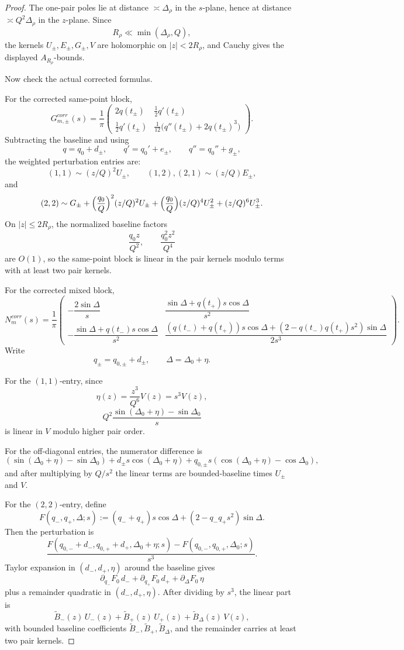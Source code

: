 \documentclass[11pt,a4paper]{amsart}
\def\corr{corr}%
\theoremstyle{plain}
\theoremstyle{definition}
\newcommand{\corr}{\mathrm{corr}}
\begin{document}
\begin{proof}
The one-pair poles lie at distance $\asymp \Delta_\rho$ in the $s$-plane,
hence at distance $\asymp Q^2\Delta_\rho$ in the $z$-plane. Since
\[
R_\rho\ll \min(\Delta_\rho,Q),
\]
the kernels $U_\pm,E_\pm,G_\pm,V$ are holomorphic on $|z|<2R_\rho$, and
Cauchy gives the displayed $A_{R_\rho}$-bounds.

Now check the actual corrected formulas.

For the corrected same-point block,
\[
G_{m,\pm}^{\corr}(s)=\frac1\pi
\begin{pmatrix}
2q(t_\pm) & \frac12 q'(t_\pm)\\[1ex]
\frac12 q'(t_\pm) & \frac1{12}\bigl(q''(t_\pm)+2q(t_\pm)^3\bigr)
\end{pmatrix}.
\]
Subtracting the baseline and using
\[
q=q_0+d_\pm,\qquad q'=q_0'+e_\pm,\qquad q''=q_0''+g_\pm,
\]
the weighted perturbation entries are:
\[
(1,1)\sim (z/Q)^2U_\pm,
\qquad
(1,2),(2,1)\sim (z/Q)E_\pm,
\]
and
\[
(2,2)\sim
G_\pm
+
\Bigl(\frac{q_0}{Q}\Bigr)^2 (z/Q)^2U_\pm
+
\Bigl(\frac{q_0}{Q}\Bigr)(z/Q)^4U_\pm^2
+
(z/Q)^6U_\pm^3.
\]
On $|z|\le 2R_\rho$, the normalized baseline factors
\[
\frac{q_0 z}{Q^2},\qquad \frac{q_0^2 z^2}{Q^4}
\]
are $O(1)$, so the same-point block is linear in the pair kernels modulo
terms with at least two pair kernels.

For the corrected mixed block,
\[
N_m^{\corr}(s)=\frac1\pi
\begin{pmatrix}
-\dfrac{2\sin\Delta}{s}
&
\dfrac{\sin\Delta+q(t_+)s\cos\Delta}{s^2}
\\[2ex]
-\dfrac{\sin\Delta+q(t_-)s\cos\Delta}{s^2}
&
\dfrac{(q(t_-)+q(t_+))s\cos\Delta+(2-q(t_-)q(t_+)s^2)\sin\Delta}{2s^3}
\end{pmatrix}.
\]
Write
\[
q_\pm=q_{0,\pm}+d_\pm,
\qquad
\Delta=\Delta_0+\eta.
\]

For the $(1,1)$-entry, since
\[
\eta(z)=\frac{z^3}{Q^6}V(z)=s^3V(z),
\]
\[
Q^2\frac{\sin(\Delta_0+\eta)-\sin\Delta_0}{s}
\]
is linear in $V$ modulo higher pair order.

For the off-diagonal entries, the numerator difference is
\[
(\sin(\Delta_0+\eta)-\sin\Delta_0)
+d_\pm s\cos(\Delta_0+\eta)
+q_{0,\pm}s(\cos(\Delta_0+\eta)-\cos\Delta_0),
\]
and after multiplying by $Q/s^2$ the linear terms are bounded-baseline times
$U_\pm$ and $V$.

For the $(2,2)$-entry, define
\[
F(q_-,q_+,\Delta;s):=(q_-+q_+)s\cos\Delta+(2-q_-q_+s^2)\sin\Delta.
\]
Then the perturbation is
\[
\frac{
F(q_{0,-}+d_-,q_{0,+}+d_+,\Delta_0+\eta;s)
-
F(q_{0,-},q_{0,+},\Delta_0;s)
}{s^3}.
\]
Taylor expansion in $(d_-,d_+,\eta)$ around the baseline gives
\[
\partial_{q_-}F_0\,d_-+\partial_{q_+}F_0\,d_++\partial_\Delta F_0\,\eta
\]
plus a remainder quadratic in $(d_-,d_+,\eta)$. After dividing by $s^3$,
the linear part is
\[
\widetilde B_-(z)\,U_-(z)+\widetilde B_+(z)\,U_+(z)+\widetilde B_\Delta(z)\,V(z),
\]
with bounded baseline coefficients $\widetilde B_-,\widetilde B_+,\widetilde
B_\Delta$, and the remainder carries at least two pair kernels.


\end{proof}
\end{document}

